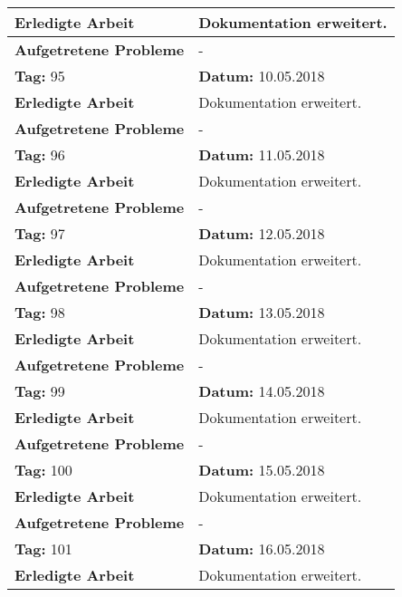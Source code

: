\begin{longtable}{|p{5cm}|p{5cm}p{6cm}|}
\textbf{Erledigte Arbeit} & \multicolumn{2}{p{11cm}|}{Dokumentation erweitert.} \\ \hline
\textbf{Aufgetretene Probleme} & \multicolumn{2}{p{11cm}|}{-} \\ \hline
\rowcolor{heading}\textbf{Tag:} 95 & \textbf{Datum:} 10.05.2018 & \\ \hline
\textbf{Erledigte Arbeit} & \multicolumn{2}{p{11cm}|}{Dokumentation erweitert.} \\ \hline
\textbf{Aufgetretene Probleme} & \multicolumn{2}{p{11cm}|}{-} \\ \hline
\rowcolor{heading}\textbf{Tag:} 96 & \textbf{Datum:} 11.05.2018 & \\ \hline
\textbf{Erledigte Arbeit} & \multicolumn{2}{p{11cm}|}{Dokumentation erweitert.} \\ \hline
\textbf{Aufgetretene Probleme} & \multicolumn{2}{p{11cm}|}{-} \\ \hline
\rowcolor{heading}\textbf{Tag:} 97 & \textbf{Datum:} 12.05.2018 & \\ \hline
\textbf{Erledigte Arbeit} & \multicolumn{2}{p{11cm}|}{Dokumentation erweitert.} \\ \hline
\textbf{Aufgetretene Probleme} & \multicolumn{2}{p{11cm}|}{-} \\ \hline
\rowcolor{heading}\textbf{Tag:} 98 & \textbf{Datum:} 13.05.2018 & \\ \hline
\textbf{Erledigte Arbeit} & \multicolumn{2}{p{11cm}|}{Dokumentation erweitert.} \\ \hline
\textbf{Aufgetretene Probleme} & \multicolumn{2}{p{11cm}|}{-} \\ \hline
\rowcolor{heading}\textbf{Tag:} 99 & \textbf{Datum:} 14.05.2018 & \\ \hline
\textbf{Erledigte Arbeit} & \multicolumn{2}{p{11cm}|}{Dokumentation erweitert.} \\ \hline
\textbf{Aufgetretene Probleme} & \multicolumn{2}{p{11cm}|}{-} \\ \hline
\rowcolor{heading}\textbf{Tag:} 100 & \textbf{Datum:} 15.05.2018 & \\ \hline
\textbf{Erledigte Arbeit} & \multicolumn{2}{p{11cm}|}{Dokumentation erweitert.} \\ \hline
\textbf{Aufgetretene Probleme} & \multicolumn{2}{p{11cm}|}{-} \\ \hline
\rowcolor{heading}\textbf{Tag:} 101 & \textbf{Datum:} 16.05.2018 & \\ \hline
\textbf{Erledigte Arbeit} & \multicolumn{2}{p{11cm}|}{Dokumentation erweitert.} \\ \hline

\end{longtable}
